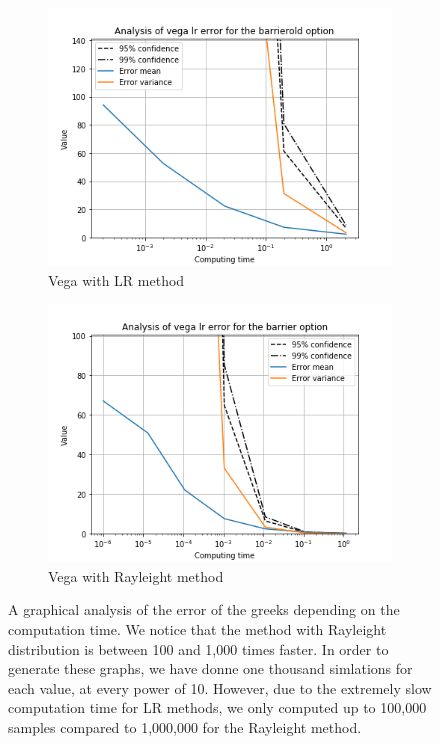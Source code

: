 \documentclass[11pt,a4paper,fleqn,draft]{article}
\begin{document}
\begin{figure}[h!]
      \begin{subfigure}[b]{0.45\textwidth}
          \includegraphics[width=\textwidth]{graphs/barrieroldvegalrtime.png}
          \caption{Vega with LR method}
      \end{subfigure}
      \begin{subfigure}[b]{0.45\textwidth}
          \includegraphics[width=\textwidth]{graphs/barriervegalrtime.png}
          \caption{Vega with Rayleight method}
      \end{subfigure}

      \caption{\label{fig:barriergraphs}A graphical analysis of the error of the greeks depending on the computation time. We notice that the method with Rayleight distribution is between 100 and 1,000 times faster. In order to generate these graphs, we have donne one thousand simlations for each value, at every power of 10. However, due to the extremely slow computation time for LR methods, we only computed up to 100,000 samples compared to 1,000,000 for the Rayleight method.}
\end{figure}
\FloatBarrier
\end{document}
